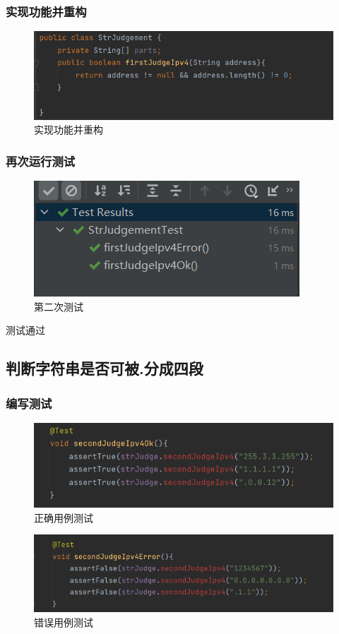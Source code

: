 \documentclass[a4paper]{article}
\begin{document}
\subsubsection*{实现功能并重构}
\begin{figure}[h]
    \centering
    \includegraphics[scale=0.8]{1.4.png}
    \caption{实现功能并重构}
    \label{fig:5}
\end{figure}
\subsubsection*{再次运行测试}
\begin{figure}[h]
    \centering
    \includegraphics[scale=0.9]{1.5.png}
    \caption{第二次测试}
    \label{fig:6}
\end{figure}
测试通过

\subsection{判断字符串是否可被.分成四段}
\subsubsection*{编写测试}
\begin{figure}[h]
    \centering
    \includegraphics[scale=0.8]{2.1.png}
    \caption{正确用例测试}
    \label{fig:7}
\end{figure}
\begin{figure}[h]
    \centering
    \includegraphics[scale=0.8]{2.2.png}
    \caption{错误用例测试}
    \label{fig:8}
\end{figure}
~\\
\end{document}
